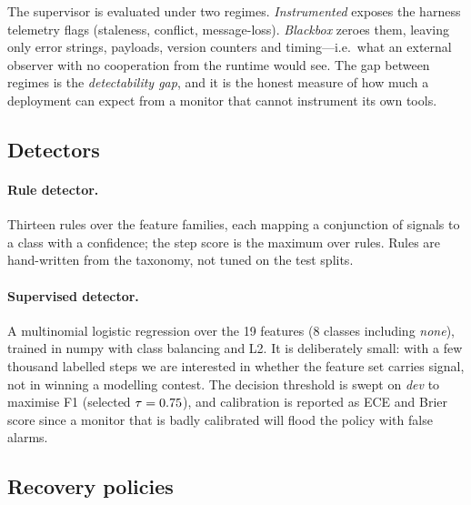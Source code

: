 The supervisor is evaluated under two regimes. \emph{Instrumented} exposes the harness telemetry
flags (staleness, conflict, message-loss). \emph{Blackbox} zeroes them, leaving only error strings,
payloads, version counters and timing---i.e.\ what an external observer with no cooperation from
the runtime would see. The gap between regimes is the \emph{detectability gap}, and it is the honest
measure of how much a deployment can expect from a monitor that cannot instrument its own tools.

\subsection{Detectors}

\paragraph{Rule detector.} Thirteen rules over the feature families, each mapping a conjunction of
signals to a class with a confidence; the step score is the maximum over rules. Rules are
hand-written from the taxonomy, not tuned on the test splits.

\paragraph{Supervised detector.} A multinomial logistic regression over the 19 features (8 classes
including \emph{none}), trained in numpy with class balancing and L2. It is deliberately small: with
a few thousand labelled steps we are interested in whether the feature set carries signal, not in
winning a modelling contest. The decision threshold is swept on \emph{dev} to maximise F1
(selected $\tau=0.75$), and calibration is reported as ECE and Brier score since a monitor
that is badly calibrated will flood the policy with false alarms.

\subsection{Recovery policies}


